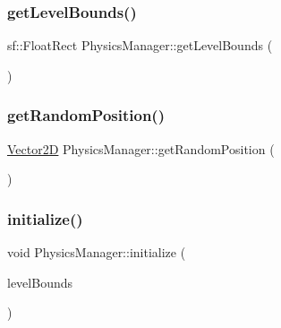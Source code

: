 \hypertarget{class_physics_manager_ab6155905552f4740b0e5c9ee8a0de83f}{}\label{class_physics_manager_ab6155905552f4740b0e5c9ee8a0de83f} 
\subsubsection{\texorpdfstring{get\+Level\+Bounds()}{getLevelBounds()}}
{\footnotesize\ttfamily sf\+::\+Float\+Rect Physics\+Manager\+::get\+Level\+Bounds (\begin{DoxyParamCaption}{ }\end{DoxyParamCaption})\hspace{0.3cm}{\ttfamily [static]}}

\hypertarget{class_physics_manager_a09f93d06f2a4a3855bedd13de9033fa5}{}\label{class_physics_manager_a09f93d06f2a4a3855bedd13de9033fa5} 
\subsubsection{\texorpdfstring{get\+Random\+Position()}{getRandomPosition()}}
{\footnotesize\ttfamily \hyperlink{class_vector2_d}{Vector2D} Physics\+Manager\+::get\+Random\+Position (\begin{DoxyParamCaption}{ }\end{DoxyParamCaption})\hspace{0.3cm}{\ttfamily [static]}}

\hypertarget{class_physics_manager_aeae6dfda767bd621e02d44984ff7df8f}{}\label{class_physics_manager_aeae6dfda767bd621e02d44984ff7df8f} 
\subsubsection{\texorpdfstring{initialize()}{initialize()}}
{\footnotesize\ttfamily void Physics\+Manager\+::initialize (\begin{DoxyParamCaption}\item[{sf\+::\+Float\+Rect}]{level\+Bounds }\end{DoxyParamCaption})\hspace{0.3cm}{\ttfamily [static]}}

